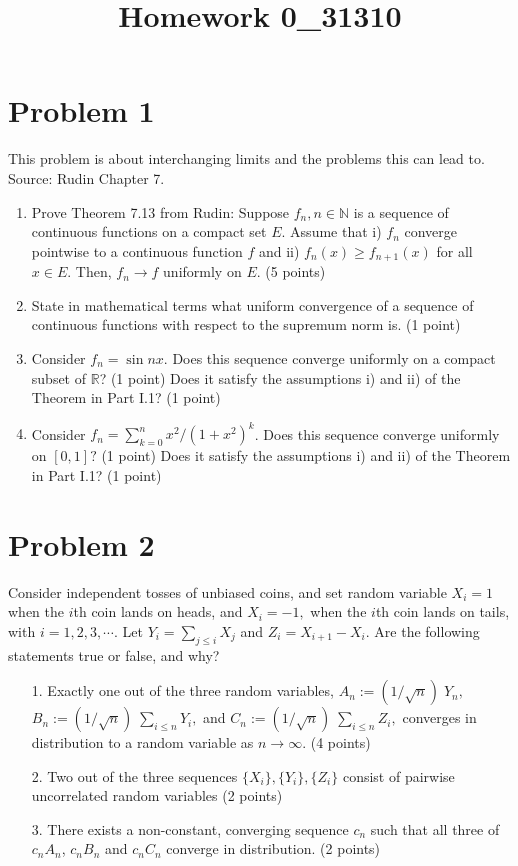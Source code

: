 \documentclass[12pt]{article}
\title{Homework 0_31310}
\begin{document}
\MakeScribeTop

\section*{Problem 1}
This problem is about interchanging limits and the problems this can lead to. Source: Rudin Chapter 7.
\begin{enumerate}
	\item Prove Theorem 7.13 from Rudin: Suppose $f_n, n \in \mathbb{N}$ is a sequence of continuous functions on a compact set $E.$ Assume that i) $f_n$ converge pointwise to a continuous function $f$ and ii) $f_n(x) \geq f_{n+1}(x)$ for all $x \in E.$ Then, $f_n \to f$ uniformly on $E.$
 (5 points)
	\item State in mathematical terms what uniform convergence of a sequence of continuous functions with respect to the supremum norm is. (1 point)
	\item Consider $f_n = \sin nx$. Does this sequence converge uniformly on a compact subset of $\mathbb{R}$? (1 point) Does it satisfy the assumptions i) and ii) of the Theorem in Part I.1? (1 point)
	\item  Consider $f_n = \sum_{k=0}^n x^2/(1+x^2)^k$. Does this sequence converge uniformly on $[0,1]?$ (1 point) Does it satisfy the assumptions i) and ii) of the Theorem in Part I.1? (1 point)

\end{enumerate}

\section*{Problem 2}
Consider independent tosses of unbiased coins, and set random variable 
$X_i = 1$ when the $i$th coin lands 
on heads, and $X_i = -1,$ when the $i$th coin lands on tails, with $i = 1,2,3,\cdots.$ Let $Y_i = \sum_{j\leq i} X_j$ and $Z_i = X_{i+1} - X_i.$  
Are the following statements true or false, and why?
\begin{itemize}
	\item[1.] Exactly one out of the three random variables, $A_n := (1/\sqrt{n}) \; Y_n,$ $B_n := (1/\sqrt{n})\; \sum_{i\leq n} Y_i,$ and $C_n := (1/\sqrt{n})\; \sum_{i\leq n} Z_i,$ converges in 
	distribution to a random variable as $n \to \infty.$  (4 points)
	\item[2.] Two out of the three sequences $ \{X_i\}, \{Y_i\}, \{Z_i\}$ consist of pairwise uncorrelated random variables (2 points) 
	\item[3.] There exists a non-constant, converging sequence $c_n$ such that all three of $c_n A_n$, $c_n B_n$ and $c_n C_n$ converge in distribution. (2 points)
\end{itemize}
\end{document}
